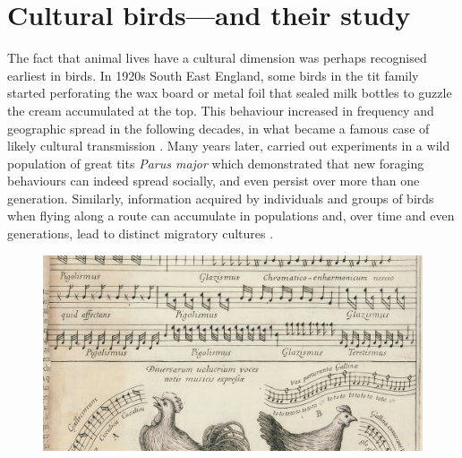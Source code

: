 \section{Cultural birds---and their study}
The fact that animal lives have a cultural dimension was perhaps recognised earliest in birds. In 1920s South East England, some birds in the tit family started perforating the wax board or metal foil that sealed milk bottles to guzzle the cream accumulated at the top. This behaviour increased in frequency and geographic spread in the following decades, in what became a famous case of likely cultural transmission \autocite{fisher1949}. Many years later, \textcite{aplin2015} carried out experiments in a wild population of great tits \textit{Parus major} which demonstrated that new foraging behaviours can indeed spread socially, and even persist over more than one generation. Similarly, information acquired by individuals and groups of birds when flying along a route can accumulate in populations and, over time and even generations, lead to distinct migratory cultures \autocite{berdahl2018,byholm2022,jesmer2018,sasaki2017}.

\begin{figure}[th!]
    \centering
    \includegraphics[width=\linewidth]{figures/chapter_1/musurgia.jpg}
    \label{c1_fig:musurgia}
\end{figure}

